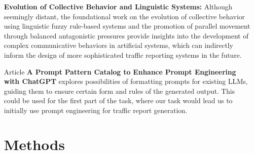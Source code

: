 \documentclass[fleqn,moreauthors,10pt]{ds_report}
\begin{document}
\textbf{Evolution of Collective Behavior and Linguistic Systems:} Although seemingly distant, the foundational work on the evolution of collective behavior using linguistic fuzzy rule-based systems \cite{Demsar2017LinguisticEvolution} and the promotion of parallel movement through balanced antagonistic pressures \cite{Demsar2016BalancedMixture} provide insights into the development of complex communicative behaviors in artificial systems, which can indirectly inform the design of more sophisticated traffic reporting systems in the future.
 
Article \textbf{A Prompt Pattern Catalog to Enhance Prompt Engineering with ChatGPT} explores possibilities of formatting prompts for existing LLMs, guiding them to ensure certain form and rules of the generated output. This could be used for the first part of the task, where our task would lead us to initially use prompt engineering for traffic report generation.

\section*{Methods}








\end{document}
